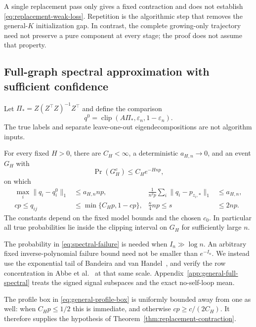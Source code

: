 A single replacement pass only gives a fixed contraction and does not establish \eqref{eq:replacement-weak-loss}. Repetition is the algorithmic step that removes the general-$K$ initialization gap. In contrast, the complete growing-only trajectory need not preserve a pure component at every stage; the proof does not assume that property.

\subsection{Full-graph spectral approximation with sufficient confidence}
Let $\Pi_*=Z(Z^\top Z)^{-1}Z^\top$ and define the comparison
\[
 q^0=\operatorname{clip}(A\Pi_*,\varepsilon_n,1-\varepsilon_n).
\]
The true labels and separate leave-one-out eigendecompositions are not algorithm inputs.

\begin{lemma}
\label{lem:full-spectral}
For every fixed $H>0$, there are $C_H<\infty$, a deterministic $a_{H,n}\to0$, and an event $G_H$ with
\begin{equation}
 \Pr(G_H^c)\le C_H e^{-Hnp},
 \label{eq:spectral-failure}
\end{equation}
on which
\begin{align}
 \max_i\|q_i-q_i^0\|_1&\le a_{H,n}np,
 &\frac1{n^2p}\sum_i\|q_i-p_{z_i,*}\|_1&\le a_{H,n},
 \label{eq:general-profile-errors}\\
 cp\le q_{ij}&\le\min\{C_Hp,1-cp\},
 &\frac\kappa4np\le s&\le2np.
 \label{eq:general-profile-box}
\end{align}
The constants depend on the fixed model bounds and the chosen $c_0$. In particular all true probabilities lie inside the clipping interval on $G_H$ for sufficiently large $n$.
\end{lemma}

The probability in \eqref{eq:spectral-failure} is needed when $I_n\gg\log n$. An arbitrary fixed inverse-polynomial failure bound need not be smaller than $e^{-I_n}$. We instead use the exponential tail of Bandeira and van Handel~\citep[Corollary 3.12 and Remark 3.13]{bandeiravhandel2016}, and verify the row concentration in Abbe et al.~\citep[Theorem 2.1 and Lemma 7]{abbe2020} at that same scale. Appendix~\ref{app:general-full-spectral} treats the signed signal subspaces and the exact no-self-loop mean.

The profile box in \eqref{eq:general-profile-box} is uniformly bounded away from one as well: when $C_Hp\le1/2$ this is immediate, and otherwise $cp\ge c/(2C_H)$. It therefore supplies the hypothesis of Theorem~\ref{thm:replacement-contraction}.

